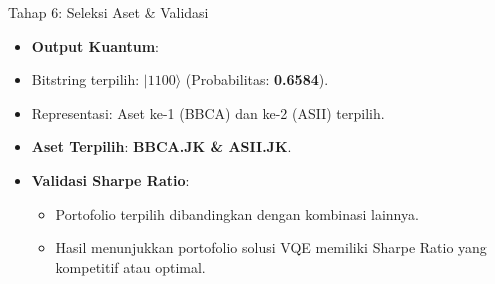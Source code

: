 \documentclass{beamer}
\begin{document}
\begin{frame}{Tahap 6: Seleksi Aset \& Validasi}
    \begin{itemize}
        \item \textbf{Output Kuantum}:
        \item Bitstring terpilih: \textbf{$|1100\rangle$} (Probabilitas: \textbf{0.6584}).
        \item Representasi: Aset ke-1 (BBCA) dan ke-2 (ASII) terpilih.
        \item \textbf{Aset Terpilih}: \textbf{BBCA.JK \& ASII.JK}.
        \vspace{0.5cm}
        \item \textbf{Validasi Sharpe Ratio}:
        \begin{itemize}
            \item Portofolio terpilih dibandingkan dengan kombinasi lainnya.
            \item Hasil menunjukkan portofolio solusi VQE memiliki Sharpe Ratio yang kompetitif atau optimal.
        \end{itemize}
    \end{itemize}
\end{frame}
\end{document}
